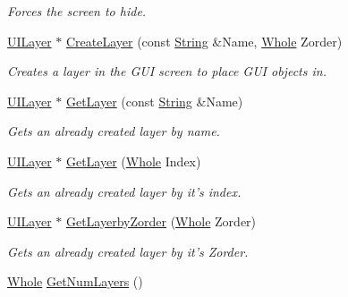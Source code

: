\begin{DoxyCompactItemize}
\begin{DoxyCompactList}\small\item\em Forces the screen to hide. \item\end{DoxyCompactList}\item 
\hyperlink{classphys_1_1UILayer}{UILayer} $\ast$ \hyperlink{classphys_1_1UIScreen_a14c3256bda81d40553ff065993fcbe77}{CreateLayer} (const \hyperlink{namespacephys_aa03900411993de7fbfec4789bc1d392e}{String} \&Name, \hyperlink{namespacephys_a460f6bc24c8dd347b05e0366ae34f34a}{Whole} Zorder)
\begin{DoxyCompactList}\small\item\em Creates a layer in the GUI screen to place GUI objects in. \item\end{DoxyCompactList}\item 
\hyperlink{classphys_1_1UILayer}{UILayer} $\ast$ \hyperlink{classphys_1_1UIScreen_a661f461325f3a67169ce0c4ee107c8eb}{GetLayer} (const \hyperlink{namespacephys_aa03900411993de7fbfec4789bc1d392e}{String} \&Name)
\begin{DoxyCompactList}\small\item\em Gets an already created layer by name. \item\end{DoxyCompactList}\item 
\hyperlink{classphys_1_1UILayer}{UILayer} $\ast$ \hyperlink{classphys_1_1UIScreen_a8b9aeb4599c47d2b4ea0a1c5d5e6f210}{GetLayer} (\hyperlink{namespacephys_a460f6bc24c8dd347b05e0366ae34f34a}{Whole} Index)
\begin{DoxyCompactList}\small\item\em Gets an already created layer by it's index. \item\end{DoxyCompactList}\item 
\hyperlink{classphys_1_1UILayer}{UILayer} $\ast$ \hyperlink{classphys_1_1UIScreen_ab558b5405a1f64d7558e34a217bfc28d}{GetLayerbyZorder} (\hyperlink{namespacephys_a460f6bc24c8dd347b05e0366ae34f34a}{Whole} Zorder)
\begin{DoxyCompactList}\small\item\em Gets an already created layer by it's Zorder. \item\end{DoxyCompactList}\item 
\hyperlink{namespacephys_a460f6bc24c8dd347b05e0366ae34f34a}{Whole} \hyperlink{classphys_1_1UIScreen_a87c4cf832f36af0182483814fec30f88}{GetNumLayers} ()

\end{DoxyCompactItemize}
